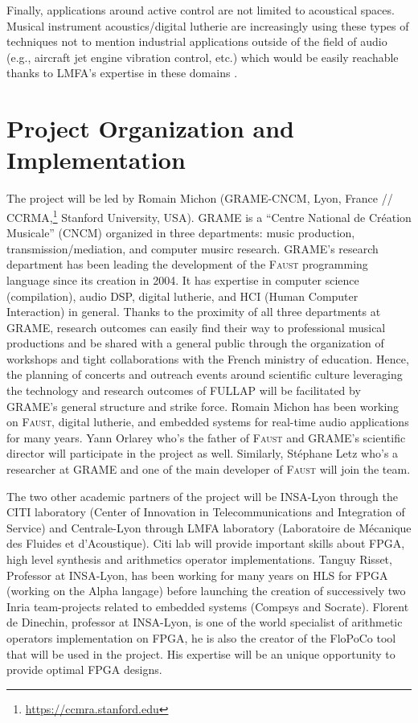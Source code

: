 \documentclass[a4paper,10pt]{article}
\newcommand{\F}{\textsc{Faust}}
\newcommand{\PP}{FULLAP}
\begin{document}
Finally, applications around active control are not limited to acoustical spaces. Musical instrument acoustics/digital lutherie are increasingly using these types of techniques \cite{Zhang2018} not to mention industrial applications outside of the field of audio (e.g., aircraft jet engine vibration control, etc.) which would be easily reachable thanks to LMFA's expertise in these domains \cite{salze2019new}.

\section*{Project Organization and Implementation}

The project will be led by Romain Michon (GRAME-CNCM, Lyon, France // CCRMA,\footnote{\url{https://ccmra.stanford.edu}} Stanford University, USA). GRAME is a ``Centre National de Création Musicale'' (CNCM) organized in three departments: music production, transmission/mediation, and computer musirc research. GRAME's research department has been leading the development of the \F{} programming language since its creation in 2004. It has expertise in computer science (compilation), audio DSP, digital lutherie, and HCI (Human Computer Interaction) in general. Thanks to the proximity of all three departments at GRAME, research outcomes can easily find their way to professional musical productions and be shared with a general public through the organization of workshops and tight collaborations with the French ministry of education. Hence, the planning of concerts and outreach events around scientific culture leveraging the technology and research outcomes of \PP{} will be facilitated by GRAME's general structure and strike force. Romain Michon has been working on \F{}, digital lutherie, and embedded systems for real-time audio applications for many years. Yann Orlarey who's the father of \F{} and GRAME's scientific director will participate in the project as well. Similarly, Stéphane Letz who's a researcher at GRAME and one of the main developer of \F{} will join the team. 

The two other academic partners of the project will be INSA-Lyon through  the CITI laboratory (Center of Innovation in Telecommunications and Integration of Service) and Centrale-Lyon through LMFA laboratory (Laboratoire de Mécanique des Fluides et d'Acoustique). Citi lab will provide important skills about FPGA, high level synthesis and arithmetics operator implementations. Tanguy Risset, Professor at INSA-Lyon,  has been working for many years on HLS for FPGA (working on the Alpha langage) before launching the creation of successively two Inria team-projects related to embedded systems (Compsys and Socrate). Florent de Dinechin, professor at INSA-Lyon, is one of the world specialist of arithmetic operators implementation on FPGA, he is also the creator of the FloPoCo tool that will be used in the project.  His expertise will be an unique opportunity to provide optimal  FPGA designs.
\end{document}
